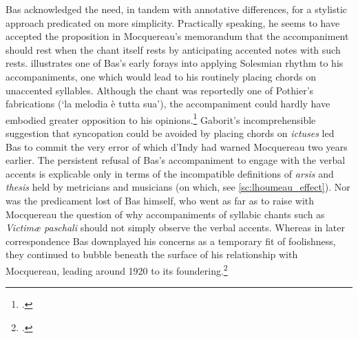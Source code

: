 Bas acknowledged the need, in tandem with annotative differences, for a stylistic approach predicated on more simplicity.
Practically speaking, he seems to have accepted the proposition in Mocquereau's memorandum that the accompaniment should rest when the chant itself rests by anticipating accented notes with such rests.
 illustrates one of Bas's early forays into applying Solesmian rhythm to his accompaniments, one which would lead to his routinely placing chords on unaccented syllables.
Although the chant was reportedly one of Pothier's fabrications (`la melodia è tutta sua'), the accompaniment could hardly have embodied greater opposition to his opinions.\footcite[cols 179, 181--2]{Salvematermisericordiae1903}
Gaborit's incomprehensible suggestion that syncopation could be avoided by placing chords on \emph{ictuses} led Bas to commit the very error of which d'Indy had warned Mocquereau two years earlier.
The persistent refusal of Bas's accompaniment to engage with the verbal accents is explicable only in terms of the incompatible definitions of \emph{arsis} and \emph{thesis} held by metricians and musicians (on which, see \cref{sc:lhoumeau_effect}).
Nor was the predicament lost of Bas himself, who went as far as to raise with Mocquereau the question of why accompaniments of syllabic chants such as \emph{Victimæ paschali} should not simply observe the verbal accents.
Whereas in later correspondence Bas downplayed his concerns as a temporary fit of foolishness, they continued to bubble beneath the surface of his relationship with Mocquereau, leading around 1920 to its foundering.\footnote{.}

